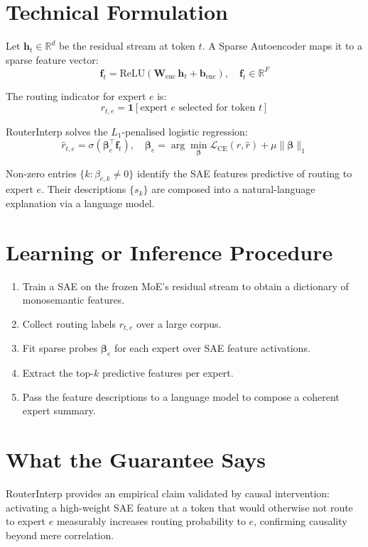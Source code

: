 \documentclass[10pt,twocolumn]{article}
\begin{document}
\section{Technical Formulation}

Let $\mathbf{h}_t \in \mathbb{R}^d$ be the residual stream at token $t$.
A Sparse Autoencoder maps it to a sparse feature vector:
\[
\mathbf{f}_t = \mathrm{ReLU}(\mathbf{W}_\text{enc}\,\mathbf{h}_t + \mathbf{b}_\text{enc}),
\quad \mathbf{f}_t \in \mathbb{R}^F
\]

The routing indicator for expert $e$ is:
\[
r_{t,e} = \mathbf{1}[\text{expert } e \text{ selected for token } t]
\]

RouterInterp solves the $L_1$-penalised logistic regression:
\[
\hat{r}_{t,e} = \sigma(\boldsymbol{\beta}_e^\top \mathbf{f}_t),
\quad \boldsymbol{\beta}_e = \arg\min_{\boldsymbol{\beta}}
\mathcal{L}_\text{CE}(r,\hat{r}) + \mu\|\boldsymbol{\beta}\|_1
\]

Non-zero entries $\{k : \beta_{e,k} \neq 0\}$ identify the SAE features
predictive of routing to expert $e$. Their descriptions $\{s_k\}$ are
composed into a natural-language explanation via a language model.

\section{Learning or Inference Procedure}

\begin{enumerate}[itemsep=2pt,parsep=0pt]
  \item Train a SAE on the frozen MoE's residual stream to obtain a
    dictionary of monosemantic features.
  \item Collect routing labels $r_{t,e}$ over a large corpus.
  \item Fit sparse probes $\boldsymbol{\beta}_e$ for each expert over SAE
    feature activations.
  \item Extract the top-$k$ predictive features per expert.
  \item Pass the feature descriptions to a language model to compose
    a coherent expert summary.
\end{enumerate}

\section{What the Guarantee Says}

RouterInterp provides an empirical claim validated by causal intervention:
activating a high-weight SAE feature at a token that would otherwise not
route to expert $e$ measurably increases routing probability to $e$,
confirming causality beyond mere correlation.
\end{document}
